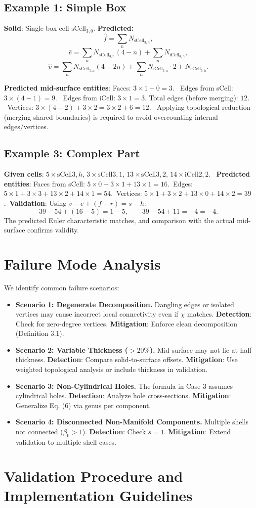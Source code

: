 \documentclass[conference]{IEEEtran}
\begin{document}
\subsection{Example 1: Simple Box}
\textbf{Solid}: Single box cell $\text{sCell}_{3,0}$.
\textbf{Predicted:}
\[
\hat{f} = \sum_n N_{\mathrm{sCell}_{3,n}},
\]
\[
\hat{e} = 
\sum_n N_{\mathrm{sCell}_{3,n}}(4-n) +
\sum_n N_{\mathrm{iCell}_{3,n}},
\]
\[
\hat{v} =
\sum_n N_{\mathrm{sCell}_{3,n}}(4-2n) +
\sum_n N_{\mathrm{iCell}_{3,n}} \cdot 2 +
N_{\mathrm{sCell}_{3,h}}.
\]

\textbf{Predicted mid-surface entities}:
Faces: $3\times 1 + 0 = 3$. \
Edges from sCell: $3\times (4-1) = 9$. \
Edges from iCell: $3\times 1 = 3$. Total edges (before merging): $12$. \
Vertices: $3\times (4-2) + 3\times 2 = 3\times 2 + 6 = 12$. \
Applying topological reduction (merging shared boundaries) is required to avoid overcounting internal edges/vertices. \subsection{Example 3: Complex Part}
\textbf{Given cells}:
$5\times \text{sCell}{3,h}$, $3\times \text{sCell}{3,1}$, $13\times \text{sCell}{3,2}$, $14\times \text{iCell}{2,2}$. \
\textbf{Predicted entities}:
Faces from sCell: $5\times 0 + 3\times 1 + 13\times 1 = 16$.\
Edges: $5\times 1 + 3\times 3 + 13\times 2 + 14\times 1 = 54$.\
Vertices: $5\times 1 + 3\times 2 + 13\times 0 + 14\times 2 = 39$.\
\textbf{Validation}: Using $v - e + (f - r) = s - h$:
\[
39 - 54 + (16 - 5) = 1 - 5,\qquad 39 - 54 + 11 = -4 = -4.
\]
The predicted Euler characteristic matches, and comparison with the actual mid-surface confirms validity. \section{Failure Mode Analysis}
We identify common failure scenarios:
\begin{itemize}
\item \textbf{Scenario 1: Degenerate Decomposition.} Dangling edges or isolated vertices may cause incorrect local connectivity even if $\chi$ matches. \textbf{Detection}: Check for zero-degree vertices. \textbf{Mitigation}: Enforce clean decomposition (Definition 3.1).
\item \textbf{Scenario 2: Variable Thickness ($>20\%$).} Mid-surface may not lie at half thickness. \textbf{Detection}: Compare solid-to-surface offsets. \textbf{Mitigation}: Use weighted topological analysis or include thickness in validation.
\item \textbf{Scenario 3: Non-Cylindrical Holes.} The formula in Case 3 assumes cylindrical holes. \textbf{Detection}: Analyze hole cross-sections. \textbf{Mitigation}: Generalize Eq. (6) via genus per component.
\item \textbf{Scenario 4: Disconnected Non-Manifold Components.} Multiple shells not connected ($\beta_0>1$). \textbf{Detection}: Check $s=1$. \textbf{Mitigation}: Extend validation to multiple shell cases.
\end{itemize} \section{Validation Procedure and Implementation Guidelines}
\end{document}
